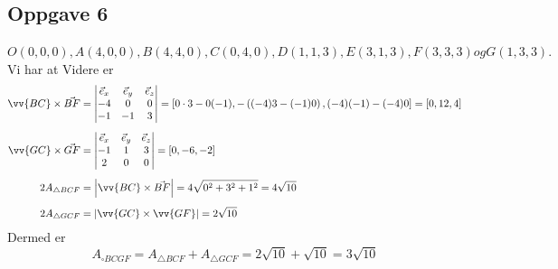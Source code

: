 \subsection*{Oppgave 6}
$ O(0 ,0 ,0) , A(4,0,0) , B(4, 4,0) , C(0, 4,0) ,
D(1,1, 3) , E (3 ,1, 3) , F (3 , 3 , 3) og G(1, 3 , 3) . $
Vi har at
Videre er
{	\footnotesize\begin{align*}
	\vv{BC}\times\vec{BF} &= \left|\begin{matrix}
		\vec{e}_x & \vec{e}_y & \vec{e}_z \\
		-4 & 0 & 0 \\
		-1 & -1 & 3
	\end{matrix}\right|=[0\cdot3-0(-1), -\left((-4)3-(-1)0\right), (-4)(-1)-(-4)0]=[0, 12, 4] \br
	\vv{GC}\times\vec{GF} &= \left|\begin{matrix}
		\vec{e}_x & \vec{e}_y & \vec{e}_z \\
		-1 & 1 & 3 \\
		2 & 0 & 0
	\end{matrix}\right|=[0, -6, -2]\br
2A_{\triangle BCF}&=\left|\vv{BC}\times\vec{BF}\right|=4\sqrt{0^2+3^2+1^2}= 4\sqrt{10}\br
2A_{\triangle GCF}&=\left|\vv{GC}\times\vv{GF}\right|=2\sqrt{10}
\end{align*}
}
Dermed er
\[ A_{\square BCGF}=A_{\triangle BCF}+A_{\triangle GCF}=2\sqrt{10}+\sqrt{10}=3\sqrt{10} \]
\newpage
